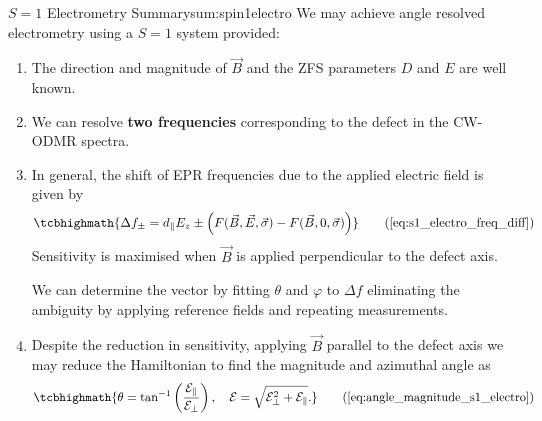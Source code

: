 

\begin{summary}{$S=1$ Electrometry Summary}{sum:spin1electro}
	We may achieve angle resolved electrometry using a $S=1$ system provided:
	\begin{enumerate}
		\item The direction and magnitude of $\vec{B}$ and the ZFS parameters $D$ and $E$ are well known.
		\item We can resolve \textbf{two frequencies} corresponding to the defect in the CW-ODMR spectra.
		\item In general, the shift of EPR frequencies due to the applied electric field is given by
		      \begin{equation}
			      \tcbhighmath{
				      \Delta f _\pm = d_\parallel E_z \pm \left(F(\vec{B},\vec{E},\vec{\sigma}) - F(\vec{B},0,\vec{\sigma})\right)
			      }
			      \tag{\ref{eq:s1_electro_freq_diff}}
		      \end{equation}
		      Sensitivity is maximised when $\vec{B}$ is applied perpendicular to the defect axis.
		
              We can determine the vector by fitting $\theta$ and $\varphi$ to $\Delta f$ eliminating the ambiguity by applying reference fields and repeating measurements.
		\item Despite the reduction in sensitivity, applying $\vec{B}$ parallel to the defect axis we may reduce the Hamiltonian to find the magnitude and azimuthal angle as
		      \begin{equation}
			      \tcbhighmath{
                      \theta = \tan^{-1} \left(\frac{\mathcal{E}_\parallel}{\mathcal{E}_\perp}\right), \quad \mathcal{E} = \sqrt{\mathcal{E}_\perp^2 + \mathcal{E}_\parallel}.
			      }
			      \tag{\ref{eq:angle_magnitude_s1_electro}}
		      \end{equation}
	\end{enumerate}

\end{summary}
